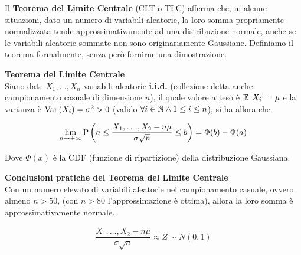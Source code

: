 Il \textbf{Teorema del Limite Centrale} (CLT o TLC) afferma che, in alcune
situazioni, dato un numero di variabili aleatorie, la loro somma
propriamente normalizzata tende approssimativamente ad una distribuzione
normale, anche se le variabili aleatorie sommate non sono originariamente
Gaussiane. Definiamo il teorema formalmente, senza però fornirne una dimostrazione.


\begin{defn}
    \textbf{Teorema del Limite Centrale} \\

    Siano date $X_1, \hdots, X_n$ variabili aleatorie \textbf{i.i.d.} (collezione
    detta anche campionamento casuale di dimensione $n$), il quale valore atteso
    è $\mathbb{E}\left[X_i\right] = \mu$ e la varianza è $\text{Var}\left(X_i\right) = \sigma^2 > 0$ (valido
    $\forall i \in \mathbb{N} \land 1 \leq i \leq n $), si ha allora che

    \begin{equation}
        \begin{aligned}
            \lim_{n \to +\infty} \text{P}\left(a \leq \dfrac{X_1, \hdots, X_2 - n\mu }{\sigma \sqrt{n}} \leq b\right) = \Phi(b) - \Phi(a)
        \end{aligned}
    \end{equation}

    Dove $\Phi(x)$ è la CDF (funzione di ripartizione) della distribuzione Gaussiana.
\end{defn}

\begin{defn}
    \textbf{Conclusioni pratiche del Teorema del Limite Centrale} \\
    Con un numero elevato di variabili aleatorie nel campionamento casuale,
    ovvero almeno $n > 50$, (con $n > 80 $ l'approssimazione è ottima), allora
    la loro somma è approssimativamente normale.

    \begin{equation*}
        \begin{aligned}
            \dfrac{X_1, \hdots, X_2 - n\mu }{\sigma \sqrt{n}}  \approx Z \sim N(0, 1)
        \end{aligned}
    \end{equation*}
\end{defn}


